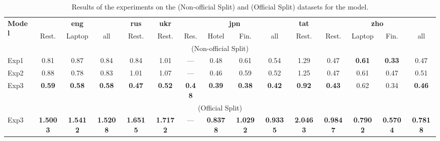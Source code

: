 \begin{table}[h]
    \centering
    \footnotesize
    \setlength{\tabcolsep}{3.5pt}
    \renewcommand{\arraystretch}{1.05}
    \begin{tabular}{l|ccc|c|c|cccc|c|cccc}
    \toprule
    \multirow{2}{*}{\textbf{Model}} &
    \multicolumn{3}{c|}{\textbf{eng}} &
    \textbf{rus} &
    \textbf{ukr} &
    \multicolumn{4}{c|}{\textbf{jpn}} &
    \textbf{tat} &
    \multicolumn{4}{c}{\textbf{zho}} \\
    \cline{2-15}
    & Rest. & Laptop & all & Rest. & Rest. & Res. & Hotel & Fin. & all & Rest. & Rest. & Laptop & Fin. & all \\
    \midrule
    \multicolumn{15}{c}{\dimabsaTrainEval{} (Non-official Split)} \\
    \midrule
    Exp1 & 0.81 & 0.87 & 0.84 & 0.84 & 1.01 & --- & 0.48 & 0.61 & 0.54 & 1.29 & 0.47 & \textbf{0.61} & \textbf{0.33} & 0.47 \\
    Exp2 & 0.88 & 0.78 & 0.83 & 1.01 & 1.07 & --- & 0.46 & 0.59 & 0.52 & 1.25 & 0.47 & 0.61 & 0.47 & 0.51 \\
    Exp3 & \textbf{0.59} & \textbf{0.58} & \textbf{0.58} & \textbf{0.47} & \textbf{0.52} & \textbf{0.48} & \textbf{0.39} & \textbf{0.38} & \textbf{0.42} & \textbf{0.92} & \textbf{0.43} & 0.62 & 0.34 & \textbf{0.46} \\
    \midrule
    \multicolumn{15}{c}{\dimabsaTest{} (Official Split)} \\
    \midrule
    Exp3 & \textbf{1.5003} & \textbf{1.5412} & \textbf{1.5208} & \textbf{1.6515} & \textbf{1.7172} & --- & \textbf{0.8378} & \textbf{1.0292} & \textbf{0.9335} & \textbf{2.0463} & \textbf{0.9847} & \textbf{0.7902} & \textbf{0.5704} & \textbf{0.7818} \\
    \bottomrule
    \end{tabular}
    \caption{Results of the experiments on the \dimabsaTrainEval{} (Non-official Split) and \dimabsaTest{} (Official Split) datasets for the \robertaBase{} model.}
    \label{tab:results}
\end{table}

